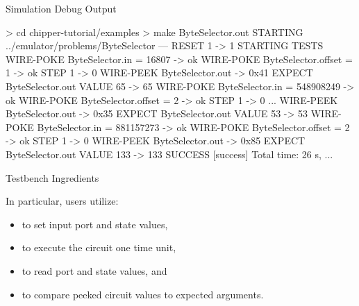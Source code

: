 \documentclass[xcolor=pdflatex,dvipsnames,table]{beamer}
\begin{document}
\begin{frame}[fragile]{Simulation Debug Output}

{
\begin{stanza}
> cd chipper-tutorial/examples
> make ByteSelector.out
STARTING ../emulator/problems/ByteSelector
---
RESET 1 -> 1
STARTING TESTS
WIRE-POKE ByteSelector.in = 16807 -> ok
WIRE-POKE ByteSelector.offset = 1 -> ok
STEP 1 -> 0
WIRE-PEEK ByteSelector.out -> 0x41
EXPECT ByteSelector.out VALUE 65 -> 65
WIRE-POKE ByteSelector.in = 548908249 -> ok
WIRE-POKE ByteSelector.offset = 2 -> ok
STEP 1 -> 0
...
WIRE-PEEK ByteSelector.out -> 0x35
EXPECT ByteSelector.out VALUE 53 -> 53
WIRE-POKE ByteSelector.in = 881157273 -> ok
WIRE-POKE ByteSelector.offset = 2 -> ok
STEP 1 -> 0
WIRE-PEEK ByteSelector.out -> 0x85
EXPECT ByteSelector.out VALUE 133 -> 133
SUCCESS
[success] Total time: 26 s, ...
\end{stanza}
}

\end{frame}

\begin{frame}{Testbench Ingredients}

In particular, users utilize:
\begin{itemize}
\item {} to set input port and state values,
\item {} to execute the circuit one time unit,
\item {} to read port and state values, and
\item {} to compare peeked circuit values to expected arguments.
\end{itemize}

\end{frame}
\end{document}
